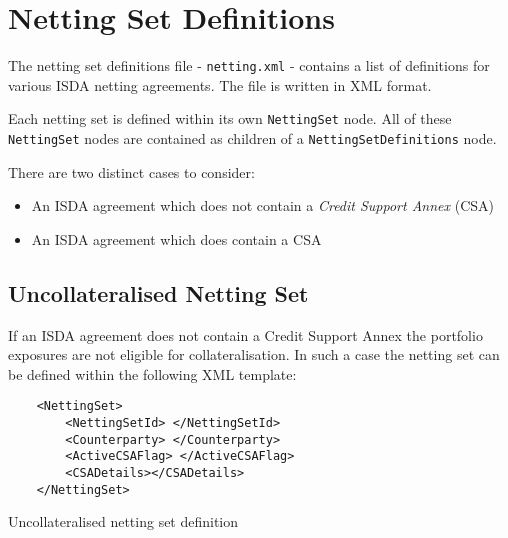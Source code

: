 \section{Netting Set Definitions}\label{sec:nettingsetinput}

The netting set definitions file - {\tt netting.xml} - 
contains a list of
definitions for various ISDA netting agreements. The file is written
in XML format. 

\vspace{1em}

Each netting set is defined within its own \lstinline!NettingSet!
node. All of these \lstinline!NettingSet! nodes are contained as
children of a \lstinline!NettingSetDefinitions! node.

\vspace{1em}

There are two distinct cases to consider:

\begin{itemize}
\item An ISDA agreement which does not contain a \emph{Credit Support
    Annex} (CSA)
\item An ISDA agreement which does contain a CSA
\end{itemize}
\subsection{Uncollateralised Netting Set}
If an ISDA agreement does not contain a Credit Support Annex the
portfolio exposures are not eligible for collateralisation. In such a
case the netting set can be defined within the following XML template:

\begin{listing}[H]
\begin{verbatim}
    <NettingSet>
        <NettingSetId> </NettingSetId>
        <Counterparty> </Counterparty>
        <ActiveCSAFlag> </ActiveCSAFlag>
        <CSADetails></CSADetails>
    </NettingSet>
\end{verbatim}
\caption{Uncollateralised netting set definition}
\label{lst:nettingSetUncollat}
\end{listing}


